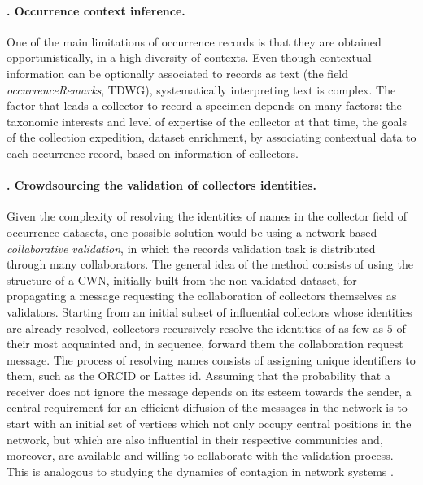 \paragraph*{\theApplicationCase. Occurrence context inference.}
One of the main limitations of occurrence records is that they are obtained opportunistically, in a high diversity of contexts.
Even though contextual information can be optionally associated to records as text (the field \textit{occurrenceRemarks}, TDWG), systematically interpreting text is complex.
%
The factor that leads a collector to record a specimen depends on many factors: 
the taxonomic interests and level of expertise of the collector at that time, 
the goals of the collection expedition, 
%
dataset enrichment, by associating contextual data to each occurrence record, based on information of collectors.


\paragraph*{\theApplicationCase. Crowdsourcing the validation of collectors identities.}
Given the complexity of resolving the identities of names in the collector field of occurrence datasets, one possible solution would be using a network-based \textit{collaborative validation}, in which the records validation task is distributed through many collaborators.
The general idea of the method consists of using the structure of a CWN, initially built from the non-validated dataset, for propagating a message requesting the collaboration of collectors themselves as validators.
Starting from an initial subset of influential collectors whose identities are already resolved, collectors recursively resolve the identities of as few as $5$ of their most acquainted and, in sequence, forward them the collaboration request message. %
The process of resolving names consists of assigning unique identifiers to them, such as the ORCID or Lattes id.
Assuming that the probability that a receiver does not ignore the message depends on its esteem towards the sender, a central requirement for an efficient diffusion of the messages in the network is to start with an initial set of vertices which not only occupy central positions in the network, but which are also influential in their respective communities and, moreover, are available and willing to collaborate with the validation process.
This is analogous to studying the dynamics of contagion in network systems \cite{Gibson2005}.




